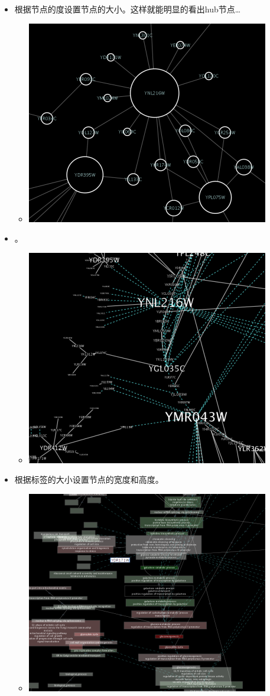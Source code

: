 \begin{itemize}
\item 根据节点的度设置节点的大小。这样就能明显的看出hub节点\ldots\begin{itemize}
\item \centerline{
 \includegraphics[width=.6\textwidth]{images/DegreeSize.png} }
\end{itemize}

\item {}。\begin{itemize}
\item \centerline{
 \includegraphics[width=.6\textwidth]{images/DegreeLabelSize.png} }
\end{itemize}

\item 根据标签的大小设置节点的宽度和高度。\begin{itemize}
\item \centerline{
 \includegraphics[width=.6\textwidth]{images/LabelWidthAndHeight.png}} 
\end{itemize}


\end{itemize}
